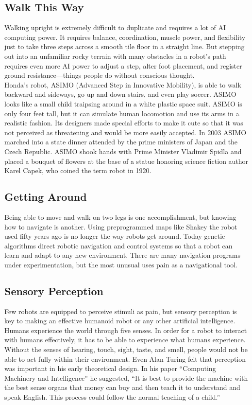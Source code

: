 \documentclass[12pt]{article}
\begin{document}
\subsection{Walk This Way}
 \large
 Walking upright is extremely difficult to duplicate and requires a lot of AI computing power. It requires balance, coordination, muscle power, and flexibility just to take three steps across a smooth tile floor in a straight line. But stepping out into an unfamiliar rocky terrain with many obstacles in a robot’s path requires even more AI power to adjust a step, alter foot placement, and register ground resistance—things people do without conscious thought.\\
  Honda’s robot, ASIMO (Advanced Step in Innovative Mobility), is able to walk backward and sideways, go up and down stairs, and even play soccer. ASIMO looks like a small child traipsing around in a white plastic space suit. ASIMO is only four feet tall, but it can simulate human locomotion and use its arms in a realistic fashion. Its designers made special efforts to make it cute so that it was not perceived as threatening and would be more easily accepted. In 2003 ASIMO marched into a state dinner attended by the prime ministers of Japan and the Czech Republic. ASIMO shook hands with Prime Minister Vladimir Spidla and placed a bouquet of flowers at the base of a statue honoring science fiction author Karel Capek, who coined the term robot in 1920.\\
  \huge
  \subsection{Getting Around}
  \large
   Being able to move and walk on two legs is one accomplishment, but knowing how to navigate is another. Using preprogrammed maps like Shakey the robot used fifty years ago is no longer the way robots get around. Today genetic algorithms direct robotic navigation and control systems so that a robot can learn and adapt to any new environment. There are many navigation programs under experimentation, but the most unusual uses pain as a navigational tool.\\
   \huge
   \subsection{Sensory Perception}
   \large
    Few robots are equipped to perceive stimuli as pain, but sensory perception is key to making an effective humanoid robot or any other artificial intelligence. Humans experience the world through five senses. In order for a robot to interact with humans effectively, it has to be able to experience what humans experience. Without the senses of hearing, touch, sight, taste, and smell, people would not be able to act fully within their environment. Even Alan Turing felt that perception was important in his early theoretical design. In his paper “Computing Machinery and Intelligence” he suggested, “It is best to provide the machine with the best sense organs that money can buy and then teach it to understand and speak English. This process could follow the normal teaching of a child.”\\
\huge
\end{document}
